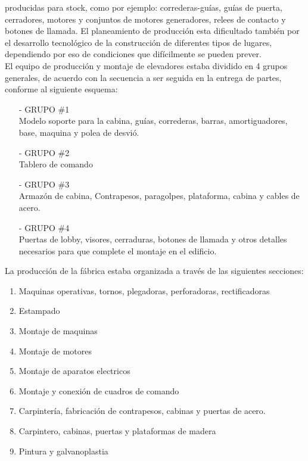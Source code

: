 \documentclass[a4paper,10pt,titlepage]{article}
\begin{document}
producidas para stock, como por ejemplo: correderas-gu\'ias, gu\'ias de puerta,
cerradores, motores y conjuntos de motores generadores, relees de contacto y botones
de llamada. El planeamiento de producci\'on esta dificultado tambi\'en por el desarrollo
tecnol\'ogico de la construcci\'on de diferentes tipos de lugares, dependiendo por eso de
condiciones que dif\'icilmente se pueden prever.\\
El equipo de producci\'on y montaje de elevadores estaba dividido en 4 grupos
generales, de acuerdo con la secuencia a ser seguida en la entrega de partes,
conforme al siguiente esquema:\\
\begin{itemize}
 \item[-] GRUPO \#1\\
Modelo soporte para la cabina, gu\'ias, correderas, barras, amortiguadores, base,
maquina y polea de desvi\'o.
\item[-] GRUPO \#2\\
Tablero de comando
\item[-] GRUPO \#3\\
Armaz\'on de cabina, Contrapesos, paragolpes, plataforma, cabina y cables de acero.
\item[-] GRUPO \#4\\
Puertas de lobby, visores, cerraduras, botones de llamada y otros detalles necesarios
para que complete el montaje en el edificio.
\end{itemize}

La producci\'on de la f\'abrica estaba organizada a trav\'es de las siguientes secciones:
\begin{enumerate}
 \item Maquinas operativas, tornos, plegadoras, perforadoras, rectificadoras
 \item Estampado
 \item Montaje de maquinas
 \item Montaje de motores
 \item Montaje de aparatos electricos
 \item Montaje y conexi\'on de cuadros de comando
 \item Carpinter\'ia, fabricaci\'on de contrapesos, cabinas y puertas de acero.
 \item Carpintero, cabinas, puertas y plataformas de madera
 \item Pintura y galvanoplastia
\end{enumerate}
\end{document}

